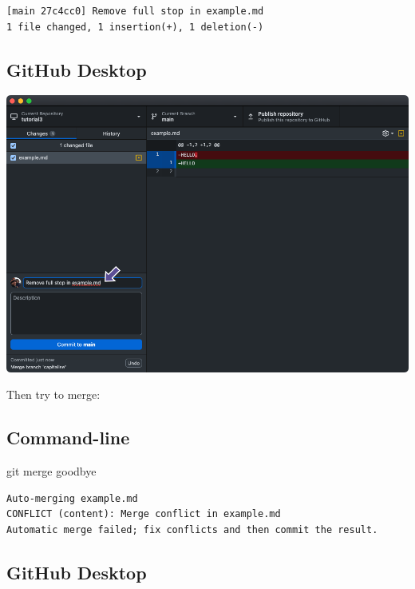 \documentclass[
  letterpaper,
  DIV=11,
  numbers=noendperiod]{scrartcl}
\newenvironment{Shaded}{\begin{snugshade}}{\end{snugshade}}
\newcommand{\FunctionTok}[1]{\textcolor[rgb]{0.28,0.35,0.67}{#1}}
\newcommand{\NormalTok}[1]{\textcolor[rgb]{0.00,0.23,0.31}{#1}}
\begin{document}
\begin{verbatim}
[main 27c4cc0] Remove full stop in example.md
1 file changed, 1 insertion(+), 1 deletion(-)
\end{verbatim}

\subsection{GitHub Desktop}

\includegraphics{images/image61.png}

Then try to merge:

\subsection{Command-line}

\begin{Shaded}
\begin{Highlighting}[]
\FunctionTok{git}\NormalTok{ merge goodbye}
\end{Highlighting}
\end{Shaded}

\begin{verbatim}
Auto-merging example.md
CONFLICT (content): Merge conflict in example.md
Automatic merge failed; fix conflicts and then commit the result.
\end{verbatim}

\subsection{GitHub Desktop}
\end{document}

